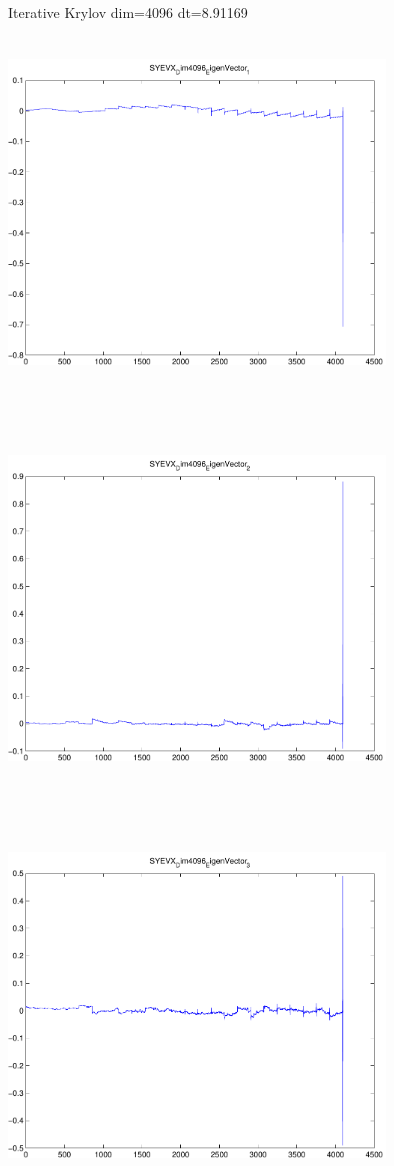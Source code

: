 \documentclass[9pt]{article}
\theoremstyle{plain}
\theoremstyle{definition}
\theoremstyle{remark}
\numberwithin{equation}{section}
\begin{document}
Iterative Krylov dim=4096 dt=8.91169
\includegraphics[width=10.0cm,height=10.0cm]{SYEVX_Dim4096_EigenVector_1.pdf}

\includegraphics[width=10.0cm,height=10.0cm]{SYEVX_Dim4096_EigenVector_2.pdf}

\includegraphics[width=10.0cm,height=10.0cm]{SYEVX_Dim4096_EigenVector_3.pdf}
\end{document}

